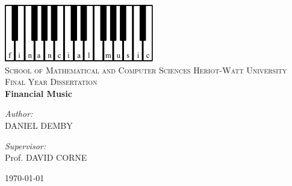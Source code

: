 \begin{titlepage}
 
\begin{center}
 
 
\includegraphics[scale=0.5]{./logo}\\[1cm]

\textsc{\Large School of Mathematical and Computer Sciences}
\textsc{\LARGE Heriot-Watt University}\\[1.5cm]
 
\textsc{\Large Final Year Dissertation}\\[0.5cm]

 
 
{ \huge \bfseries Financial Music}\\[0.4cm]

\vfill

\begin{minipage}{0.4\textwidth}
\begin{flushleft} \large
\emph{Author:}\\
\textsc{DANIEL DEMBY}
\end{flushleft}
\end{minipage}
\begin{minipage}{0.4\textwidth}
\begin{flushright} \large
\emph{Supervisor:} \\
Prof. \textsc{DAVID CORNE}
\end{flushright}
\end{minipage}
 
\vfill
 
\vfill

\vfill
 
{\large \today}

\end{center}
 
\end{titlepage}